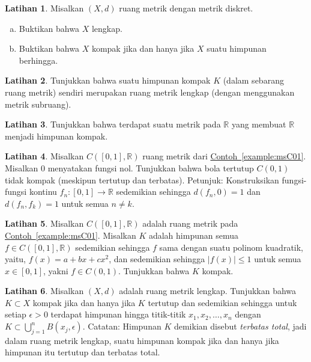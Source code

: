 \documentclass[12pt,openany]{book}
\newcommand{\abs}[1]{\left\lvert {#1} \right\rvert}
\newcommand{\R}{{\mathbb{R}}}
\newcommand{\myindex}[1]{#1\index{#1}}
\theoremstyle{plain}
\theoremstyle{remark}
\theoremstyle{definition}
\newenvironment{exbox}{%
    \def\FrameCommand{\vrule width 1pt \relax\hspace{10pt}}%
    \MakeFramed{\advance\hsize-\width\FrameRestore}%
}{%
    \endMakeFramed
}
\newenvironment{exparts}{%
    \leavevmode\begin{enumerate}[a),noitemsep,topsep=0pt,parsep=0pt,partopsep=0pt]
}{%
    \end{enumerate}
}
\theoremstyle{exercise}
\newtheorem{exercise}{Latihan}[section]
\theoremstyle{example}
\newcommand{\exampleref}[1]{\hyperref[#1]{Contoh~\ref*{#1}}}
\begin{document}
\begin{exbox}
\begin{exercise}
Misalkan $(X,d)$ ruang metrik dengan metrik diskret.
\begin{exparts}
\item
Buktikan bahwa $X$ lengkap.
\item
Buktikan bahwa $X$ kompak jika dan hanya jika $X$ suatu himpunan berhingga.
\end{exparts}
\end{exercise}

\begin{exercise}
Tunjukkan bahwa suatu himpunan kompak $K$ (dalam sebarang ruang metrik)
sendiri merupakan ruang metrik lengkap (dengan menggunakan metrik subruang).
\end{exercise}

\begin{exercise}
Tunjukkan bahwa terdapat suatu metrik pada $\R$ yang membuat $\R$ menjadi himpunan kompak.
\end{exercise}

\begin{exercise} \label{exercise:msclbounnotcompt}
Misalkan $C([0,1],\R)$ ruang metrik dari \exampleref{example:msC01}. Misalkan $0$
menyatakan fungsi nol. Tunjukkan bahwa bola tertutup
$C(0,1)$ tidak kompak (meskipun tertutup dan terbatas).
Petunjuk: Konstruksikan fungsi-fungsi kontinu $f_n \colon [0,1] \to \R$ sedemikian sehingga
$d(f_n,0) = 1$ dan $d(f_n,f_k) = 1$ untuk semua $n \neq k$.
\end{exercise}

\begin{exercise}
Misalkan $C([0,1],\R)$ adalah ruang metrik pada \exampleref{example:msC01}.
Misalkan $K$ adalah himpunan semua $f \in C([0,1],\R)$ sedemikian sehingga
$f$ sama dengan suatu polinom kuadratik, yaitu, $f(x) = a+bx+cx^2$, dan sedemikian sehingga
$\abs{f(x)} \leq 1$ untuk semua $x \in [0,1]$,
yakni $f \in C(0,1)$.  Tunjukkan bahwa $K$ kompak.
\end{exercise}

\begin{exercise} \label{exercise:mstotbound}
Misalkan $(X,d)$ adalah ruang metrik lengkap.
Tunjukkan bahwa $K \subset X$ kompak jika dan hanya jika $K$ tertutup
dan sedemikian sehingga untuk setiap $\epsilon > 0$
terdapat himpunan hingga titik-titik $x_1,x_2,\ldots,x_n$ dengan
$K \subset \bigcup_{j=1}^n B(x_j,\epsilon)$.
Catatan: Himpunan $K$ demikian disebut \emph{\myindex{terbatas total}},
jadi dalam ruang metrik lengkap, suatu himpunan kompak jika dan hanya
jika himpunan itu tertutup dan terbatas total.
\end{exercise}


\end{exbox}
\end{document}
